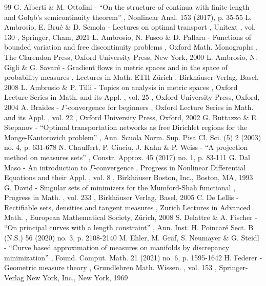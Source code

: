 \documentclass[11pt]{article}
\numberwithin{equation}{section}
\theoremstyle{definition}
\begin{document}
\begin{thebibliography}{99}
 G. Alberti \& M. Ottolini - “On the structure of continua with finite length and Gołąb’s semicontinuity theorem” , Nonlinear Anal. 153 (2017), p. 35-55
 L. Ambrosio, E. Brué \& D. Semola - Lectures on optimal transport , Unitext , vol. 130 , Springer, Cham, 2021
 L. Ambrosio, N. Fusco \& D. Pallara - Functions of bounded variation and free discontinuity problems , Oxford Math. Monographs , The Clarendon Press, Oxford University Press, New York, 2000
 L. Ambrosio, N. Gigli \& G. Savaré - Gradient flows in metric spaces and in the space of probability measures , Lectures in Math. ETH Zürich , Birkhäuser Verlag, Basel, 2008
 L. Ambrosio \& P. Tilli - Topics on analysis in metric spaces , Oxford Lecture Series in Math. and its Appl. , vol. 25 , Oxford University Press, Oxford, 2004
 A. Braides - $\Gamma $-convergence for beginners , Oxford Lecture Series in Math. and its Appl. , vol. 22 , Oxford University Press, Oxford, 2002
 G. Buttazzo \& E. Stepanov - “Optimal transportation networks as free Dirichlet regions for the Monge-Kantorovich problem” , Ann. Scuola Norm. Sup. Pisa Cl. Sci. (5) 2 (2003) no. 4, p. 631-678
 N. Chauffert, P. Ciuciu, J. Kahn \& P. Weiss - “A projection method on measures sets” , Constr. Approx. 45 (2017) no. 1, p. 83-111
 G. Dal Maso - An introduction to $\Gamma $-convergence , Progress in Nonlinear Differential Equations and their Appl. , vol. 8 , Birkhäuser Boston, Inc., Boston, MA, 1993
 G. David - Singular sets of minimizers for the Mumford-Shah functional , Progress in Math. , vol. 233 , Birkhäuser Verlag, Basel, 2005
 C. De Lellis - Rectifiable sets, densities and tangent measures , Zurich Lectures in Advanced Math. , European Mathematical Society, Zürich, 2008
 S. Delattre \& A. Fischer - “On principal curves with a length constraint” , Ann. Inst. H. Poincaré Sect. B (N.S.) 56 (2020) no. 3, p. 2108-2140
 M. Ehler, M. Gräf, S. Neumayer \& G. Steidl - “Curve based approximation of measures on manifolds by discrepancy minimization” , Found. Comput. Math. 21 (2021) no. 6, p. 1595-1642
 H. Federer - Geometric measure theory , Grundlehren Math. Wissen. , vol. 153 , Springer-Verlag New York, Inc., New York, 1969

\end{thebibliography}
\end{document}
